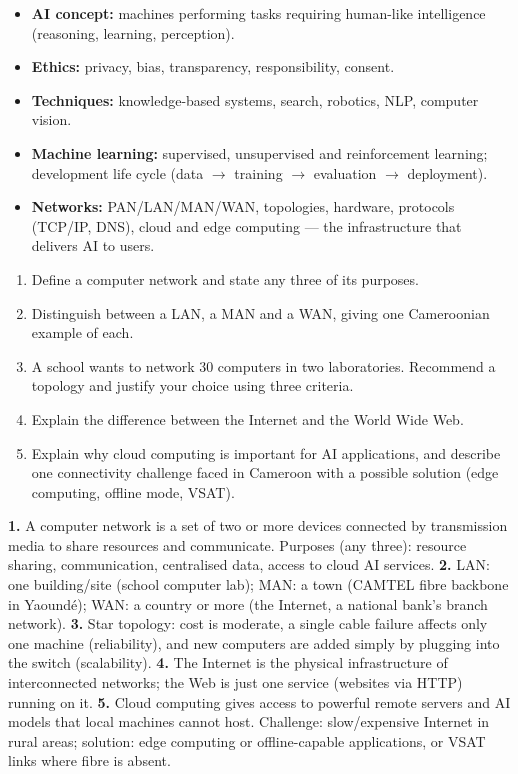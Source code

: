 \documentclass[11pt]{article}
\begin{document}
\begin{aretenir}
\begin{itemize}
\item \textbf{AI concept:} machines performing tasks requiring human-like intelligence (reasoning, learning, perception).
\item \textbf{Ethics:} privacy, bias, transparency, responsibility, consent.
\item \textbf{Techniques:} knowledge-based systems, search, robotics, NLP, computer vision.
\item \textbf{Machine learning:} supervised, unsupervised and reinforcement learning; development life cycle (data $\rightarrow$ training $\rightarrow$ evaluation $\rightarrow$ deployment).
\item \textbf{Networks:} PAN/LAN/MAN/WAN, topologies, hardware, protocols (TCP/IP, DNS), cloud and edge computing --- the infrastructure that delivers AI to users.
\end{itemize}
\end{aretenir}

\begin{exercice}
\begin{enumerate}
\item Define a computer network and state any three of its purposes.
\item Distinguish between a LAN, a MAN and a WAN, giving one Cameroonian example of each.
\item A school wants to network 30 computers in two laboratories. Recommend a topology and justify your choice using three criteria.
\item Explain the difference between the Internet and the World Wide Web.
\item Explain why cloud computing is important for AI applications, and describe one connectivity challenge faced in Cameroon with a possible solution (edge computing, offline mode, VSAT).
\end{enumerate}
\end{exercice}

\begin{corrige}[Exercise 1]
\textbf{1.} A computer network is a set of two or more devices connected by transmission media to share resources and communicate. Purposes (any three): resource sharing, communication, centralised data, access to cloud AI services.
\textbf{2.} LAN: one building/site (school computer lab); MAN: a town (CAMTEL fibre backbone in Yaoundé); WAN: a country or more (the Internet, a national bank's branch network).
\textbf{3.} Star topology: cost is moderate, a single cable failure affects only one machine (reliability), and new computers are added simply by plugging into the switch (scalability).
\textbf{4.} The Internet is the physical infrastructure of interconnected networks; the Web is just one service (websites via HTTP) running on it.
\textbf{5.} Cloud computing gives access to powerful remote servers and AI models that local machines cannot host. Challenge: slow/expensive Internet in rural areas; solution: edge computing or offline-capable applications, or VSAT links where fibre is absent.
\end{corrige}
\end{document}
